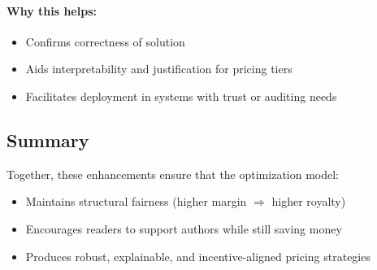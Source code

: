 \paragraph{Why this helps:}
\begin{itemize}
    \item Confirms correctness of solution
    \item Aids interpretability and justification for pricing tiers
    \item Facilitates deployment in systems with trust or auditing needs
\end{itemize}

\subsection{Summary}

Together, these enhancements ensure that the optimization model:
\begin{itemize}
    \item Maintains structural fairness (higher margin \(\Rightarrow\) higher royalty)
    \item Encourages readers to support authors while still saving money
    \item Produces robust, explainable, and incentive-aligned pricing strategies
\end{itemize}
